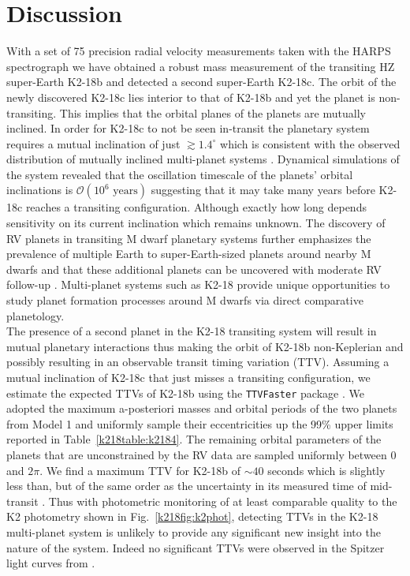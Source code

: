 \section{Discussion} \label{k218sect:disc}
With a set of 75 precision radial velocity measurements taken with the HARPS spectrograph
we have obtained a robust mass measurement of the transiting HZ super-Earth K2-18b and
detected a second super-Earth K2-18c. The orbit of the newly discovered K2-18c lies
interior to that of K2-18b and yet the planet is non-transiting. This implies that the orbital
planes of the planets are mutually inclined. In order for K2-18c
to not be seen in-transit the planetary system requires a mutual inclination of just
$\gtrsim 1.4^{\circ}$ which is consistent with the observed distribution of mutually inclined
multi-planet systems \citep{figueira12, fabrycky14}. Dynamical simulations of the system
revealed that the oscillation timescale of the planets' orbital inclinations is
$\mathcal{O}(10^6 \text{ years})$ suggesting that it may take many years before K2-18c reaches a transiting
configuration. Although exactly how long depends sensitivity on its current inclination which remains
unknown. The discovery of RV planets in transiting M dwarf planetary systems 
further emphasizes the prevalence of multiple Earth to super-Earth-sized planets around
nearby M dwarfs and that these additional planets can be uncovered with moderate RV follow-up
\citep{cloutier17a}. Multi-planet systems such as K2-18 provide unique opportunities to study
planet formation processes around M dwarfs via direct comparative planetology.  \\

The presence of a second planet in the K2-18 transiting system will result in mutual 
planetary interactions thus making the orbit of K2-18b non-Keplerian and possibly resulting
in an observable transit timing variation (TTV). Assuming a mutual inclination of K2-18c
that just misses a transiting configuration, we estimate the expected TTVs 
of K2-18b using the \texttt{TTVFaster} package \citep{deck14, agol16}. We adopted the maximum a-posteriori
masses and orbital periods of the two planets from Model 1 and uniformly sample their
eccentricities up the 99\%
upper limits reported in Table~\ref{k218table:k2184}. The remaining orbital parameters of the planets that
are unconstrained by the RV data 
are sampled uniformly between 0 and $2\pi$. We find a maximum TTV for K2-18b of $\sim 40$
seconds which is slightly less than, but of the same order as the uncertainty in its measured
time of mid-transit .
Thus with photometric monitoring of at least comparable quality to the K2 photometry
shown in Fig.~\ref{k218fig:k2phot}, detecting TTVs in the K2-18 multi-planet system is unlikely to provide
any significant new insight into the nature of the system. Indeed no significant TTVs were observed in
the Spitzer light curves from . \\

